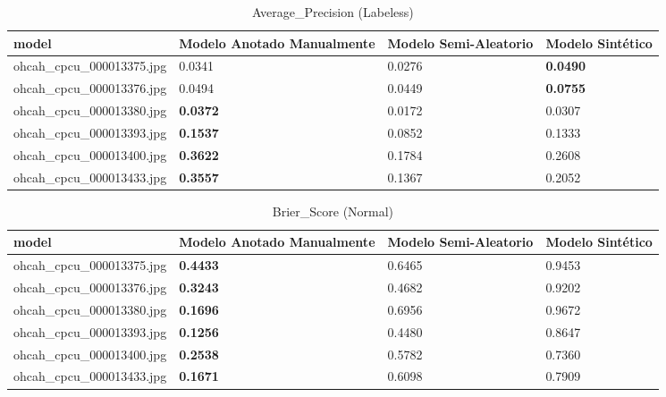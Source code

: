 \documentclass[twocolumn, fontsize=10pt]{article}
\begin{document}
\begin{table*}[ht]
\centering
\caption{Average\_Precision (Labeless)}
\label{tab:avg_prec_labeless}
\setlength{\tabcolsep}{6pt}
\renewcommand{\arraystretch}{1.2}
\begin{tabular}{|l|l|l|l|}
\hline
model & Modelo Anotado Manualmente & Modelo Semi-Aleatorio & Modelo Sintético \\ \hline
ohcah\_cpcu\_000013375.jpg & 0.0341 & 0.0276 & \textbf{0.0490} \\ \hline
ohcah\_cpcu\_000013376.jpg & 0.0494 & 0.0449 & \textbf{0.0755} \\ \hline
ohcah\_cpcu\_000013380.jpg & \textbf{0.0372} & 0.0172 & 0.0307 \\ \hline
ohcah\_cpcu\_000013393.jpg & \textbf{0.1537} & 0.0852 & 0.1333 \\ \hline
ohcah\_cpcu\_000013400.jpg & \textbf{0.3622} & 0.1784 & 0.2608 \\ \hline
ohcah\_cpcu\_000013433.jpg & \textbf{0.3557} & 0.1367 & 0.2052 \\ \hline
\end{tabular}
\end{table*}



\begin{table*}[ht]
\centering
\caption{Brier\_Score (Normal)}
\label{tab:brier_score_normal}
\setlength{\tabcolsep}{6pt}
\renewcommand{\arraystretch}{1.2}
\begin{tabular}{|l|l|l|l|}
\hline
model & Modelo Anotado Manualmente & Modelo Semi-Aleatorio & Modelo Sintético \\ \hline
ohcah\_cpcu\_000013375.jpg & \textbf{0.4433} & 0.6465 & 0.9453 \\ \hline
ohcah\_cpcu\_000013376.jpg & \textbf{0.3243} & 0.4682 & 0.9202 \\ \hline
ohcah\_cpcu\_000013380.jpg & \textbf{0.1696} & 0.6956 & 0.9672 \\ \hline
ohcah\_cpcu\_000013393.jpg & \textbf{0.1256} & 0.4480 & 0.8647 \\ \hline
ohcah\_cpcu\_000013400.jpg & \textbf{0.2538} & 0.5782 & 0.7360 \\ \hline
ohcah\_cpcu\_000013433.jpg & \textbf{0.1671} & 0.6098 & 0.7909 \\ \hline
\end{tabular}
\end{table*}
\end{document}
